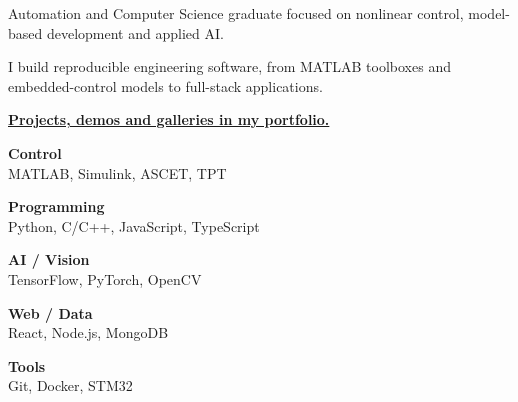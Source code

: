 \documentclass[10pt]{spidercv}
\begin{document}
\begin{SideBar}{\ColorBackground}{\ColorTextSide}
  {\small\RaggedRight
    Automation and Computer Science graduate focused on nonlinear control, model-based development and applied AI.

    \vspace{0.35cm}
    I build reproducible engineering software, from MATLAB toolboxes and embedded-control models to full-stack applications.

    \vspace{0.35cm}
    \href{https://portofolio-carla-barastean.netlify.app}{\textbf{Projects, demos and galleries in my portfolio.}}
    \par}

  \vspace{0.55cm}

  \vspace{0.65cm}
  \begin{ItemList}{\ColorHighlight}
    \item[\faCogs] \textbf{Control}\\ MATLAB, Simulink, ASCET, TPT
    \item[\faCode] \textbf{Programming}\\ Python, C/C++, JavaScript, TypeScript
    \item[\faLineChart] \textbf{AI / Vision}\\ TensorFlow, PyTorch, OpenCV
    \item[\faLaptop] \textbf{Web / Data}\\ React, Node.js, MongoDB
    \item[\faGitSquare] \textbf{Tools}\\ Git, Docker, STM32
  \end{ItemList}

  \vspace{0.55cm}
  \begin{SkillGauges}
  \end{SkillGauges}
\end{SideBar}
\end{document}
